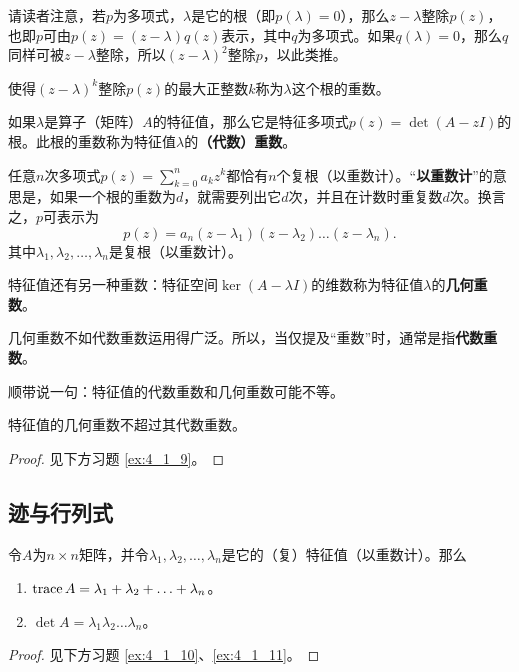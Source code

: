 请读者注意，若$p$为多项式，$\lambda$是它的根（即$p(\lambda)=0$），那么$z-\lambda$整除$p(z)$，也即$p$可由$p(z)=(z-\lambda)q(z)$表示，其中$q$为多项式。如果$q(\lambda)=0$，那么$q$同样可被$z-\lambda$整除，所以$(z-\lambda)^2$整除$p$，以此类推。

使得$(z-\lambda)^k$整除$p(z)$的最大正整数$k$称为$\lambda$这个根的重数。

如果$\lambda$是算子（矩阵）$A$的特征值，那么它是特征多项式$p(z)=\det(A-zI)$的根。此根的重数称为特征值$\lambda$的\textbf{（代数）重数}。

任意$n$次多项式$p(z)=\sum_{k=0}^{n}a_{k}z^{k}$都恰有$n$个复根（以重数计）。“\textbf{以重数计}”的意思是，如果一个根的重数为$d$，就需要列出它$d$次，并且在计数时重复数$d$次。换言之，$p$可表示为\[p(z)=a_n(z-\lambda_1)(z-\lambda_2)\ldots(z-\lambda_n).\]其中$\lambda_{1},\lambda_{2},\ldots,\lambda_{n}$是复根（以重数计）。

特征值还有另一种重数：特征空间$\ker(A-\lambda I)$的维数称为特征值$\lambda$的\textbf{几何重数}。

几何重数不如代数重数运用得广泛。所以，当仅提及“重数”时，通常是指\textbf{代数重数}。

顺带说一句：特征值的代数重数和几何重数可能不等。

\begin{proposition}
    特征值的几何重数不超过其代数重数。
\end{proposition}
\begin{proof}
    见下方习题 \ref{ex:4_1_9}。
\end{proof}

\subsection{迹与行列式}

\begin{theorem}
    令$A$为$n\times n$矩阵，并令$\lambda_{1},\lambda_{2},\ldots,\lambda_{n}$是它的（复）特征值（以重数计）。那么
    \begin{enumerate}
        \item $\operatorname{trace} A=\lambda_1+\lambda_2+\ldots+\lambda_n$。
        \item $\det A=\lambda_1\lambda_2\ldots\lambda_n$。
    \end{enumerate}
\end{theorem}
\begin{proof}
    见下方习题 \ref{ex:4_1_10}、\ref{ex:4_1_11}。
\end{proof}

